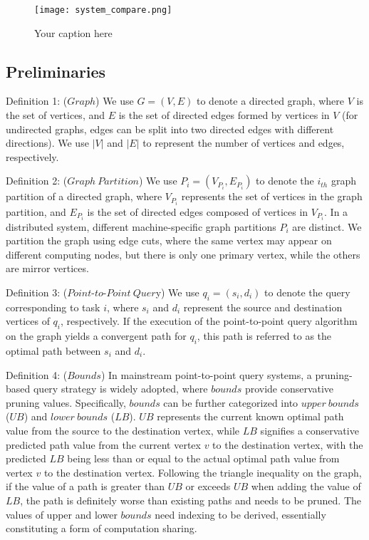 \documentclass[lettersize,journal]{IEEEtran} %
\begin{document}
\begin{figure}[!t]
    \centering
    \texttt{[image: system\_compare.png]}
    \caption{Your caption here}
    \label{fig:system_compare}
  \end{figure}


\subsection{Preliminaries}
Definition 1: ($Graph$) We use $G=(V,E)$ to denote a directed graph, where $V$ is the set of vertices, and $E$ is the set of directed edges formed by vertices in $V$ (for undirected graphs, edges can be split into two directed edges with different directions). We use $|V|$ and $|E|$ to represent the number of vertices and edges, respectively.

Definition 2: ($Graph~Partition$) We use $P_i=(V_{P_i},E_{P_i})$ to denote the $i_{th}  $ graph partition of a directed graph, where $V_{P_i}$ represents the set of vertices in the graph partition, and $E_{P_i}$ is the set of directed edges composed of vertices in $V_{P_i}$. In a distributed system, different machine-specific graph partitions $P_i$ are distinct. We partition the graph using edge cuts, where the same vertex may appear on different computing nodes, but there is only one primary vertex, while the others are mirror vertices.

Definition 3: ($Point \text{-} to \text{-} Point~Quer$y) We use $q_i=(s_i,d_i)$ to denote the query corresponding to task $i$, where $s_i$ and $d_i$ represent the source and destination vertices of $q_i$, respectively. If the execution of the point-to-point query algorithm on the graph yields a convergent path for $q_i$, this path is referred to as the optimal path between $s_i$ and $d_i$.

Definition 4: ($Bounds$) In mainstream point-to-point query systems, a pruning-based query strategy is widely adopted, where $bounds$ provide conservative pruning values. Specifically, $bounds$ can be further categorized into $upper~bounds$ ($UB$) and $lower~bounds$ ($LB$). $UB$ represents the current known optimal path value from the source to the destination vertex, while $LB$ signifies a conservative predicted path value from the current vertex $v$ to the destination vertex, with the predicted $LB$ being less than or equal to the actual optimal path value from vertex $v$ to the destination vertex. Following the triangle inequality on the graph, if the value of a path is greater than $UB$ or exceeds $UB$ when adding the value of $LB$, the path is definitely worse than existing paths and needs to be pruned. The values of upper and lower $bounds$ need indexing to be derived, essentially constituting a form of computation sharing.
\end{document}
